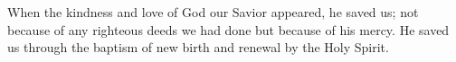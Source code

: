\lettrine[lines=3]{W}{}hen the kindness and love of God our Savior appeared, he saved us; not because of any righteous deeds we had done but because of his mercy. He saved us through the baptism of new birth and renewal by the Holy Spirit.
